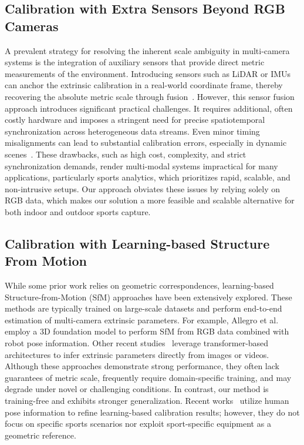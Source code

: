 \documentclass[a4paper, 10pt, conference]{ieeeconf}      %
\begin{document}
\subsection{Calibration with Extra Sensors Beyond RGB Cameras} \label{sec:related_work_egocentric}
A prevalent strategy for resolving the inherent scale ambiguity in multi-camera systems is the integration of auxiliary sensors that provide direct metric measurements of the environment. Introducing sensors such as LiDAR or IMUs can anchor the extrinsic calibration in a real-world coordinate frame, thereby recovering the absolute metric scale through fusion~\cite{desai2018skeleton, lee2021robust, yang2024yowo}. 
However, this sensor fusion approach introduces significant practical challenges. It requires additional, often costly hardware and imposes a stringent need for precise spatiotemporal synchronization across heterogeneous data streams. Even minor timing misalignments can lead to substantial calibration errors, especially in dynamic scenes~\cite{lee2021robust}. These drawbacks, such as high cost, complexity, and strict synchronization demands, render multi-modal systems impractical for many applications, particularly sports analytics, which prioritizes rapid, scalable, and non-intrusive setups. Our approach obviates these issues by relying solely on RGB data, which makes our solution a more feasible and scalable alternative for both indoor and outdoor sports capture.

\subsection{Calibration with Learning-based Structure From Motion} \label{sec:related_work_learning_based}
While some prior work relies on geometric correspondences, learning-based Structure-from-Motion (SfM) approaches have been extensively explored. These methods are typically trained on large-scale datasets and perform end-to-end estimation of multi-camera extrinsic parameters. For example, Allegro et al.~\cite{allegro2025calib3r} employ a 3D foundation model to perform SfM from RGB data combined with robot pose information. Other recent studies~\cite{keetha2025mapanything,wang2025vggt} leverage transformer-based architectures to infer extrinsic parameters directly from images or videos. Although these approaches demonstrate strong performance, they often lack guarantees of metric scale, frequently require domain-specific training, and may degrade under novel or challenging conditions. In contrast, our method is training-free and exhibits stronger generalization. Recent works~\cite{muller2025reconstructing,javerliat2025kineo} utilize human pose information to refine learning-based calibration results; however, they do not focus on specific sports scenarios nor exploit sport-specific equipment as a geometric reference. 
\end{document}
